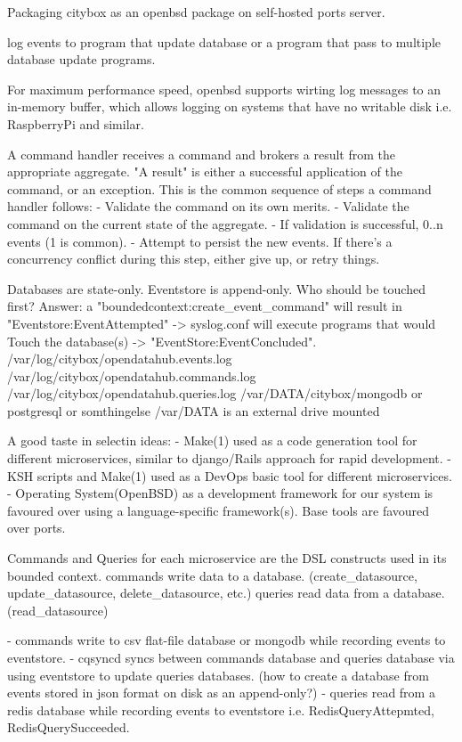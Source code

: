 Packaging citybox as an openbsd package on self-hosted ports server.

log events to program that update database or a program that pass to multiple database update programs.

For maximum performance speed, openbsd supports wirting log messages to an in-memory buffer, 
which allows logging on systems that have no writable disk i.e. RaspberryPi and similar.


A command handler receives a command and brokers a result from the appropriate aggregate. "A result" is either a successful application of the command, or an exception. This is the common sequence of steps a command handler follows:
- Validate the command on its own merits.
- Validate the command on the current state of the aggregate.
- If validation is successful, 0..n events (1 is common).
- Attempt to persist the new events. If there's a concurrency conflict during this step, either give up, or retry things.


Databases are state-only. 
Eventstore is append-only. 
Who should be touched first?
Answer: a "boundedcontext:create_event_command" will result in 
"Eventstore:EventAttempted" -> syslog.conf will execute programs that would Touch the database(s) -> "EventStore:EventConcluded".
/var/log/citybox/opendatahub.events.log
/var/log/citybox/opendatahub.commands.log
/var/log/citybox/opendatahub.queries.log
/var/DATA/citybox/mongodb or postgresql or somthingelse
/var/DATA is an external drive mounted

A good taste in selectin ideas:
- Make(1) used as a code generation tool for different microservices, similar to django/Rails approach for rapid development. 
- KSH scripts and Make(1) used as a DevOps basic tool for different microservices.
- Operating System(OpenBSD) as a development framework for our system is favoured over using a language-specific framework(s). Base tools are favoured over ports. 

Commands and Queries for each microservice are the DSL constructs used in its bounded context.
commands write data to a database. (create_datasource, update_datasource, delete_datasource, etc.)
queries read data from a database. (read_datasource)

- commands write to csv flat-file database or mongodb while recording events to eventstore.
- cqsyncd syncs between commands database and queries database via using eventstore to update queries databases. (how to create a database from events stored in json format on disk as an append-only?)
- queries read from a redis database while recording events to eventstore i.e. RedisQueryAttepmted, RedisQuerySucceeded.

